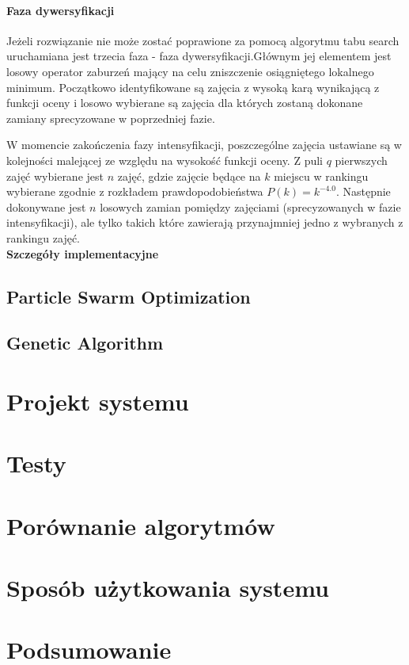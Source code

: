\documentclass[11pt]{report}
\begin{document}
\subsubsection{Faza dywersyfikacji}
\par Jeżeli rozwiązanie nie może zostać poprawione za pomocą algorytmu tabu search uruchamiana jest trzecia faza - faza dywersyfikacji.Głównym jej elementem jest losowy operator zaburzeń mający na celu zniszczenie osiągniętego lokalnego minimum. Początkowo identyfikowane są zajęcia z wysoką karą wynikającą z funkcji oceny  i losowo wybierane są zajęcia dla których zostaną dokonane zamiany sprecyzowane w poprzedniej fazie.
\par W momencie zakończenia fazy intensyfikacji, poszczególne zajęcia ustawiane są w kolejności malejącej ze względu na wysokość funkcji oceny. Z puli $q$ pierwszych zajęć wybierane jest $n$ zajęć, gdzie zajęcie będące na $k$ miejscu w rankingu wybierane zgodnie z rozkładem prawdopodobieństwa $P(k) = k^{-4.0}$. Następnie dokonywane jest $n$ losowych zamian pomiędzy zajęciami (sprecyzowanych w fazie intensyfikacji), ale tylko takich które zawierają przynajmniej jedno z wybranych z rankingu zajęć. \\
\textbf{Szczegóły implementacyjne}
\section{Particle Swarm Optimization}
\section{Genetic Algorithm}
\chapter{Projekt systemu}
\chapter{Testy}
\chapter{Porównanie algorytmów}
\chapter{Sposób użytkowania systemu}
\chapter{Podsumowanie}
\end{document}
